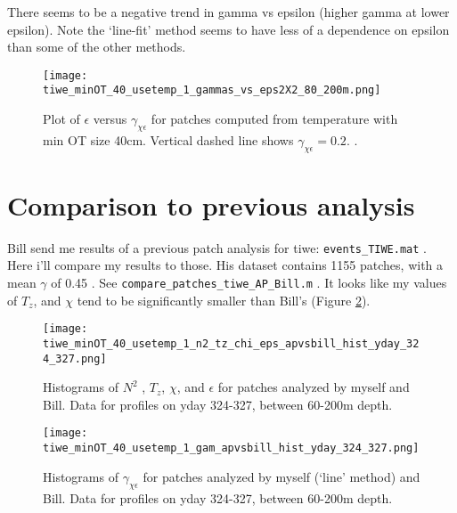 \documentclass[11pt]{article}
\begin{document}
There seems to be a negative trend in gamma vs epsilon (higher gamma at lower epsilon). Note the `line-fit' method seems to have less of a dependence on epsilon than some of the other methods.

\begin{figure}[htbp]
\texttt{[image: tiwe\_minOT\_40\_usetemp\_1\_gammas\_vs\_eps2X2\_80\_200m.png]}
\caption{Plot of $\epsilon$ versus $\gamma_{\chi\epsilon}$  for patches computed from temperature with min OT size 40cm. Vertical dashed line shows $\gamma_{\chi\epsilon}=0.2$.  .}
\label{patch_gam_vs_eps}
\end{figure}





\clearpage
\section{Comparison to previous analysis}

Bill send me results of a previous patch analysis for tiwe: \verb+events_TIWE.mat+ . Here i'll compare my results to those. His dataset contains 1155 patches, with a mean $\gamma$ of 0.45 . See \verb+compare_patches_tiwe_AP_Bill.m+ . It looks like my values of $T_z$, and $\chi$ tend to be significantly smaller than Bill's (Figure \ref{comp_bill_ap_1}).%

\begin{figure}[htbp]
\texttt{[image: tiwe\_minOT\_40\_usetemp\_1\_n2\_tz\_chi\_eps\_apvsbill\_hist\_yday\_324\_327.png]}
\caption{Histograms of $N^2$ , $T_z$, $\chi$, and $\epsilon$ for patches analyzed by myself and Bill. Data for profiles on yday 324-327, between 60-200m depth.}
\label{comp_bill_ap_1}
\end{figure}
%

\begin{figure}[htbp]
\texttt{[image: tiwe\_minOT\_40\_usetemp\_1\_gam\_apvsbill\_hist\_yday\_324\_327.png]}
\caption{Histograms of $\gamma_{\chi\epsilon}$ for patches analyzed by myself (`line' method)  and Bill. Data for profiles on yday 324-327, between 60-200m depth.}
\label{comp_bill_ap_gam}
\end{figure}
\end{document}
